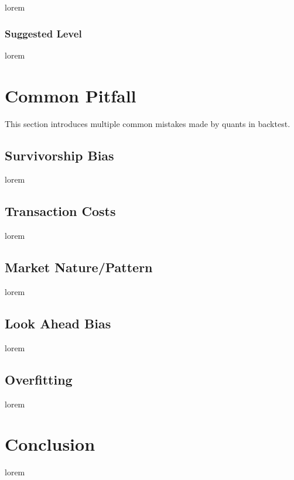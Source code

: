 \documentclass[12pt]{article}
\begin{document}
lorem

\subsubsection*{Suggested Level}

lorem

\section{Common Pitfall}

This section introduces multiple common mistakes made by quants in backtest.

\subsection{Survivorship Bias}

lorem

\subsection{Transaction Costs}

lorem

\subsection{Market Nature/Pattern}

lorem

\subsection{Look Ahead Bias}

lorem

\subsection{Overfitting}

lorem

\section*{Conclusion}

lorem

\renewcommand{\refname}{Reference} %
\printbibliography
\end{document}
